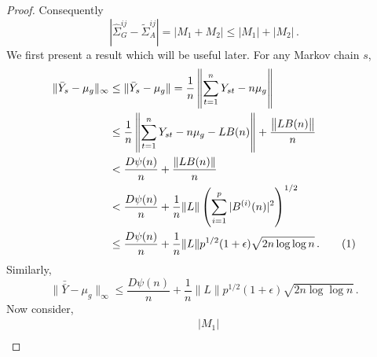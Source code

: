 \documentclass[12pt]{article}
\newcommand\numberthis{\addtocounter{equation}{1}\tag{\theequation}}
\theoremstyle{remark}
\begin{document}
\begin{proof}
Consequently
\[
\left|\hat{\Sigma}_{G}^{ij} - \tilde{\Sigma}_{A}^{ij}  \right| = |M_1 + M_2| \leq |M_1| + |M_2|\,.
\]
%
We first present a result which will be useful later. For any Markov chain $s$, 
\begin{align*}
  \|\bar{Y}_s - \mu_g\|_{\infty} & \leq \|\bar{Y}_s - \mu_g\| = \dfrac{1}{n}\left\|\sum_{t=1}^{n}Y_{st} - n\mu_g\right\| \\
  & \leq \dfrac{1}{n}\left\|\sum_{t=1}^{n}Y_{st} - n \mu_g - L B(n)\right\| + \dfrac{\left\|L B(n)\right\|}{n}\\
  &< \dfrac{D\psi(n)}{n} + \dfrac{\|L B(n)\|}{n}\\
  &< \dfrac{D\psi(n)}{n} + \dfrac{1}{n}\|L\| \left(\sum\limits_{i=1}^{p}|B^{(i)}(n)|^2\right)^{1/2}\\
  & \leq \dfrac{D\psi(n)}{n} + \dfrac{1}{n}\|L\| p^{1/2}(1+\epsilon)\sqrt{2n \log\log n}\,. \numberthis \label{eq:xbars_bound}
\end{align*}
 Similarly,
 \begin{equation}
\label{eq:xbarbar_bound}
   \| \bar{\bar{Y}} - \mu_g\|_{\infty} \leq \dfrac{D\psi(n)}{n} + \dfrac{1}{n}\|L\| p^{1/2}(1+\epsilon)\sqrt{2n \log\log n}\,.
\end{equation}
%
Now consider,
\begin{align*}
& |M_1| \\ 

\end{align*}
\end{proof}
\end{document}
